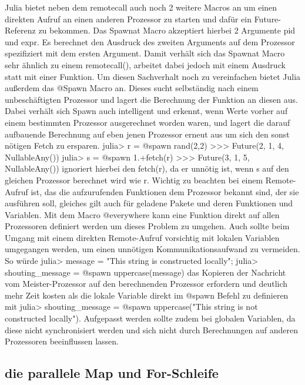\documentclass[proseminar,german,utf8]{zihpub}
\begin{document}
Julia bietet neben dem remotecall auch noch 2 weitere Macros an um einen direkten Aufruf an einen anderen Prozessor zu starten und dafür ein Future-Referenz zu bekommen. Das Spawnat Macro akzeptiert hierbei 2 Argumente pid und expr. Es berechnet den Ausdruck des zweiten Arguments auf dem Prozessor spezifiziert mit dem ersten Argument.  Damit verhält sich das Spawnat Macro sehr ähnlich zu einem remotecall(), arbeitet dabei jedoch mit einem Ausdruck statt mit einer Funktion. Um diesen Sachverhalt noch zu vereinfachen bietet Julia außerdem das @Spawn Macro an. Dieses sucht selbständig nach einem unbeschäftigten Prozessor und lagert die Berechnung der Funktion an diesen aus. Dabei verhält sich Spawn auch intelligent und erkennt, wenn Werte vorher auf einem bestimmten Prozessor ausgerechnet worden waren, und lagert die darauf aufbauende Berechnung auf eben jenen Prozessor erneut aus um sich den sonst nötigen Fetch zu ersparen. julia> r = @spawn rand(2,2) >>> Future(2, 1, 4, Nullable{Any}())
julia> s = @spawn 1.+fetch(r) >>> Future(3, 1, 5, Nullable{Any}()) ignoriert hierbei den fetch(r), da er unnötig ist, wenn s auf den gleichen Prozessor berechnet wird wie r. Wichtig zu beachten bei einem Remote-Aufruf ist, das die aufzurufenden Funktionen dem Prozessor bekannt sind, der sie ausführen soll, gleiches gilt auch für geladene Pakete und deren Funktionen und Variablen. Mit dem Macro @everywhere kann eine Funktion direkt auf allen Prozessoren definiert werden um dieses Problem zu umgehen. Auch sollte beim Umgang mit einem direkten Remote-Aufruf vorsichtig mit lokalen Variablen umgegangen werden, um einen unnötigen Kommunikationsaufwand zu vermeiden. So würde julia> message = "This string is constructed locally";
julia> shouting\_message = @spawn uppercase(message) das Kopieren der Nachricht vom Meister-Prozessor auf den berechnenden Prozessor erfordern und deutlich mehr Zeit kosten als die lokale Variable direkt im @spawn Befehl zu definieren mit julia> shouting\_message = @spawn uppercase("This string is not constructed locally"). Aufgepasst werden sollte zudem bei globalen Variablen, da diese nicht synchronisiert werden und sich nicht durch Berechnungen auf anderen Prozessoren beeinflussen lassen.

\subsection{die parallele Map und For-Schleife }
\end{document}
